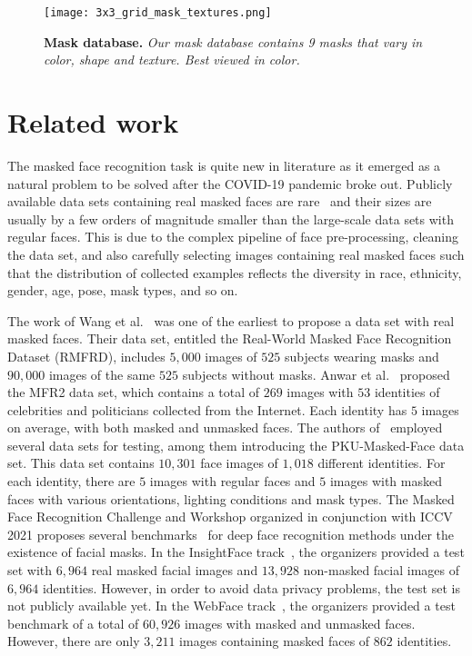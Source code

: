 \documentclass{article}
\begin{document}
\begin{figure}[t] 
\begin{center}
   \texttt{[image: 3x3\_grid\_mask\_textures.png]}
\end{center}
\vspace{-0.3cm}
   \caption{{\bf Mask database. }\emph {Our mask database contains 9 masks that vary in color, shape and texture. Best viewed in color.}}
\label{fig:mask-database} 
\end{figure}

\section{Related work}

The masked face recognition task is quite new in literature as it emerged as a natural problem to be solved after the COVID-19 pandemic broke out. 
Publicly available data sets containing real masked faces are rare~\cite{wang2020arxiv,anwar2020arxiv,zhu2021arxiv} and their sizes are usually by a few orders of magnitude smaller than the large-scale data sets with regular faces. 
This is due to the complex pipeline of face pre-processing, cleaning the data set, and also carefully selecting images containing real masked faces such that the distribution of collected examples reflects the diversity in race, ethnicity, gender, age, pose, mask types, and so on.

The work of Wang et al.~\cite{wang2020arxiv} was one of the earliest to propose a data set with real masked faces. Their data set, entitled the Real-World Masked Face Recognition Dataset (RMFRD), includes $5,000$ images of $525$ subjects wearing masks and $90,000$ images of the same $525$ subjects without masks. 
Anwar et al.~\cite{anwar2020arxiv} proposed the MFR2 data set, which contains a total of $269$ images with $53$ identities of celebrities and politicians collected from the Internet. Each identity has $5$ images on average, with both masked and unmasked faces. 
The authors of~\cite{ding2020icm} employed several data sets for testing, among them introducing the PKU-Masked-Face data set. This data set contains $10,301$ face images of $1,018$ different identities. For each identity, there are $5$ images with regular faces and $5$ images with masked faces with various orientations, lighting conditions and mask types. 
The Masked Face Recognition Challenge and Workshop organized in conjunction with ICCV 2021 proposes several benchmarks~\cite{deng2021arxiv,zhu2021arxiv} for deep face recognition methods under the existence of facial masks. In the InsightFace track~\cite{deng2021arxiv}, the organizers provided a test set with $6,964$ real masked facial images and $13,928$ non-masked facial images of $6,964$ identities. However, in order to avoid data privacy problems, the test set is not publicly available yet. In the WebFace track~\cite{zhu2021arxiv}, the organizers provided a test benchmark of a total of $60,926$ images with masked and unmasked faces. However, there are only $3,211$ images containing masked faces of $862$ identities. 
\end{document}
